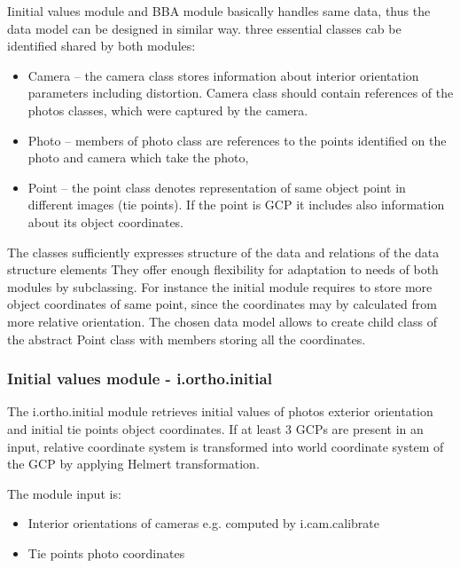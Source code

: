 \documentclass[a4paper,12pt]{article}
\begin{document}
Iinitial values module and BBA module basically handles  same data, thus 
the data model can be designed in similar way. 
 three essential classes cab be identified shared by both modules:
\begin{itemize}
\item Camera -- the camera class stores information about interior orientation 
parameters including distortion. Camera class should contain references of the photos
classes, which were captured by the camera.
\item Photo -- members of photo class are references to the points identified 
	    on the photo and camera which take the photo,
\item Point -- the point class denotes representation of same object point in different images (tie points).
 If the point is GCP it includes also information about its object coordinates. 
\end{itemize}

The classes sufficiently expresses  structure of the data and relations of the data structure elements
They offer enough flexibility for adaptation to needs of both modules by subclassing. 
For instance the initial module requires to store more object coordinates of same point, 
since the coordinates may by calculated from more relative orientation. The chosen data model allows 
to create child class of the abstract Point class with members storing all the coordinates. 

\subsubsection{Initial values module - i.ortho.initial}


The i.ortho.initial module retrieves initial values of photos exterior orientation and initial tie points object coordinates. If at least 3 GCPs are 
present in an input, relative coordinate system is transformed into world coordinate system of the GCP by applying Helmert transformation. 


The module input is: 
\begin{itemize}
\item Interior orientations of cameras e.g. computed by i.cam.calibrate
\item Tie points photo coordinates 
\end{itemize}
\end{document}
